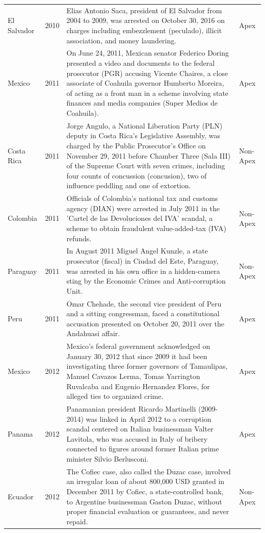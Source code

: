 \begin{landscape}
\begin{longtable}{@{}l c p{15.5cm} l@{}}
El Salvador & 2010 & Elias Antonio Saca, president of El Salvador from 2004 to 2009, was arrested on October 30, 2016 on charges including embezzlement (peculado), illicit association, and money laundering. & Apex \\
Mexico & 2011 & On June 24, 2011, Mexican senator Federico Doring presented a video and documents to the federal prosecutor (PGR) accusing Vicente Chaires, a close associate of Coahuila governor Humberto Moreira, of acting as a front man in a scheme involving state finances and media companies (Super Medios de Coahuila). & Apex \\
Costa Rica & 2011 & Jorge Angulo, a National Liberation Party (PLN) deputy in Costa Rica's Legislative Assembly, was charged by the Public Prosecutor's Office on November 29, 2011 before Chamber Three (Sala III) of the Supreme Court with seven crimes, including four counts of concussion (concusion), two of influence peddling and one of extortion. & Non-Apex \\
Colombia & 2011 & Officials of Colombia's national tax and customs agency (DIAN) were arrested in July 2011 in the 'Cartel de las Devoluciones del IVA' scandal, a scheme to obtain fraudulent value-added-tax (IVA) refunds. & Non-Apex \\
Paraguay & 2011 & In August 2011 Miguel Angel Kunzle, a state prosecutor (fiscal) in Ciudad del Este, Paraguay, was arrested in his own office in a hidden-camera sting by the Economic Crimes and Anti-corruption Unit. & Non-Apex \\
Peru & 2011 & Omar Chehade, the second vice president of Peru and a sitting congressman, faced a constitutional accusation presented on October 20, 2011 over the Andahuasi affair. & Apex \\
Mexico & 2012 & Mexico's federal government acknowledged on January 30, 2012 that since 2009 it had been investigating three former governors of Tamaulipas, Manuel Cavazos Lerma, Tomas Yarrington Ruvalcaba and Eugenio Hernandez Flores, for alleged ties to organized crime. & Apex \\
Panama & 2012 & Panamanian president Ricardo Martinelli (2009-2014) was linked in April 2012 to a corruption scandal centered on Italian businessman Valter Lavitola, who was accused in Italy of bribery connected to figures around former Italian prime minister Silvio Berlusconi. & Apex \\
Ecuador & 2012 & The Cofiec case, also called the Duzac case, involved an irregular loan of about 800,000 USD granted in December 2011 by Cofiec, a state-controlled bank, to Argentine businessman Gaston Duzac, without proper financial evaluation or guarantees, and never repaid. & Non-Apex \\

\end{longtable}
\end{landscape}
